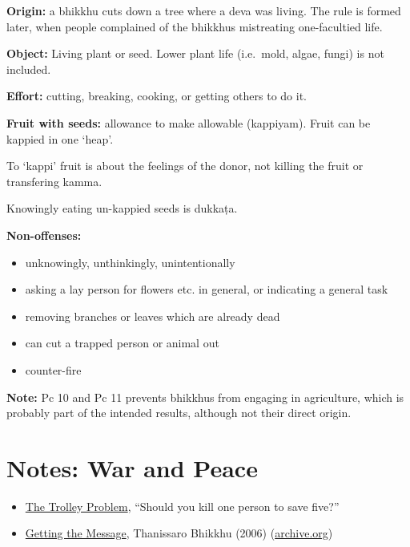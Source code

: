 \begin{multicols}{2}

\textbf{Origin:} a bhikkhu cuts down a tree where a deva was living. The
rule is formed later, when people complained of the bhikkhus mistreating
one-facultied life.

\textbf{Object:} Living plant or seed. Lower plant life (i.e.~mold,
algae, fungi) is not included.

\textbf{Effort:} cutting, breaking, cooking, or getting others to do it.

\textbf{Fruit with seeds:} allowance to make allowable (kappiyam). Fruit
can be kappied in one `heap'.

\columnbreak

To `kappi' fruit is about the feelings of the donor, not killing the
fruit or transfering kamma.

Knowingly eating un-kappied seeds is dukkaṭa.

\textbf{Non-offenses:}

\begin{itemize}
\tightlist
\item
  unknowingly, unthinkingly, unintentionally
\item
  asking a lay person for flowers etc. in general, or indicating a
  general task
\item
  removing branches or leaves which are already dead
\item
  can cut a trapped person or animal out
\item
  counter-fire
\end{itemize}

\end{multicols}
\par
\enlargethispage{2\baselineskip}

\textbf{Note:} Pc 10 and Pc 11 prevents bhikkhus from engaging in
agriculture, which is probably part of the intended results, although
not their direct origin.

\clearpage

\section{Notes: War and Peace}

\begin{itemize}
\item
  \href{https://en.wikipedia.org/wiki/Trolley_problem}{The Trolley
  Problem}, ``Should you kill one person to save five?''
\item
  \href{https://www.buddhistinquiry.org/article/getting-the-message/}{Getting
  the Message}, Thanissaro Bhikkhu (2006)
  (\href{https://web.archive.org/web/20201113023105/https://www.buddhistinquiry.org/article/getting-the-message/}{archive.org})
\end{itemize}

